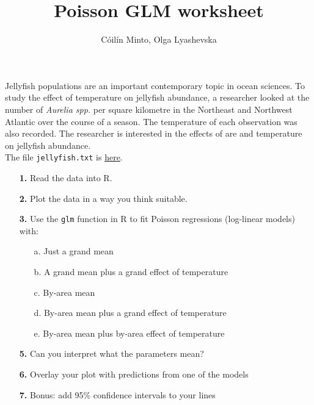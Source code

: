 \documentclass[a4paper,12pt]{article}
\title{Poisson GLM worksheet}
\author{C\'oil\'in Minto, Olga Lyashevska}
\date{}
\begin{document}
\maketitle
\noindent Jellyfish populations are an important contemporary topic in ocean sciences. To study the effect of temperature on jellyfish abundance, a researcher looked at the number of \emph{Aurelia spp.} per square kilometre in the Northeast and Northwest Atlantic over the course of a season. The temperature of each observation was also recorded. The researcher is interested in the effects of are and temperature on jellyfish abundance.\\
The file \texttt{jellyfish.txt} is \href{https://github.com/mintoc/mfrc-stats/tree/main/glm_2022/data}{here}.
\vspace{1cm}
\begin{itemize}
 \item[{\bf 1.}] Read the data into R.
 \item[{\bf 2.}] Plot the data in a way you think suitable.
 \item[{\bf 3.}] Use the \texttt{glm} function in R to fit Poisson regressions (log-linear models) with:
\begin{itemize}
\item[a.] Just a grand mean
\item[b.] A grand mean plus a grand effect of temperature
\item[c.] By-area mean
\item[d.] By-area mean plus a grand effect of temperature
\item[e.] By-area mean plus by-area effect of temperature
\end{itemize}
 \item[{\bf 5.}] Can you interpret what the parameters mean?
 \item[{\bf 6.}] Overlay your plot with predictions from one of the models
 \item[{\bf 7.}] Bonus: add 95\% confidence intervals to your lines
\end{itemize}
\end{document}
